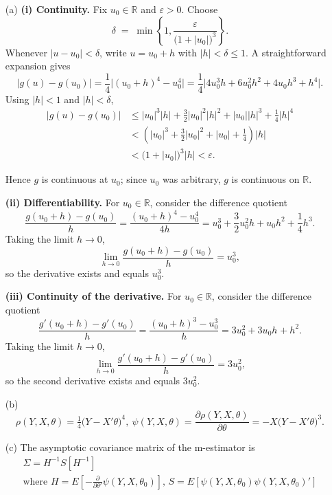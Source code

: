 \documentclass{article}
\begin{document}
\begin{itemize}
    \item[(a)]
    \textbf{(i) Continuity.}  
    Fix $u_0\in\mathbb R$ and $\varepsilon>0$.  Choose
    \[
    \delta \;=\;\min\!\left\{1,\frac{\varepsilon}{\bigl(1+|u_0|\bigr)^{3}}\right\}.
    \]
    Whenever $\lvert u-u_0\rvert<\delta$, write $u=u_0+h$ with $\lvert h\rvert<\delta\le1$.  A straightforward expansion gives
    \[
    \bigl|g(u)-g(u_0)\bigr|
       = \frac14\bigl|(u_0+h)^4-u_0^{4}\bigr|
       = \frac14\bigl|4u_0^{3}h+6u_0^{2}h^{2}+4u_0h^{3}+h^{4}\bigr|.
    \]
    Using $\lvert h\rvert<1$ and $\lvert h\rvert<\delta$, 
    \begin{align*}
        \bigl|g(u)-g(u_0)\bigr|
      &\le |u_0|^{3}\lvert h\rvert
         +\tfrac32 |u_0|^{2}|h|^{2}
         +|u_0| |h|^{3}
         +\tfrac14 |h|^{4}\\
         &<(|u_0|^3+\tfrac32 |u_0|^{2}+|u_0|+\tfrac14)|h|\\
      &< \bigl(1+|u_0|\bigr)^{3}\lvert h\rvert
      <\varepsilon.
    \end{align*}

    Hence $g$ is continuous at $u_0$; since $u_0$ was arbitrary, $g$ is continuous on $\mathbb R$.
    
    \medskip\noindent
    \textbf{(ii) Differentiability.}  
    For $u_0\in\mathbb R$, consider the difference quotient
    \[
    \frac{g(u_0+h)-g(u_0)}{h}
      =\frac{(u_0+h)^{4}-u_0^{4}}{4h}
      =u_0^{3}+\frac{3}{2}u_0^{2}h+u_0h^{2}+\frac14 h^{3}.
    \]
    Taking the limit $h\to0$,
    \[
    \lim_{h\to0}\frac{g(u_0+h)-g(u_0)}{h}=u_0^{3},
    \]
    so the derivative exists and equals $u_0^{3}$.
    
    \medskip\noindent
    \textbf{(iii) Continuity of the derivative.}  
    For $u_0\in\mathbb R$, consider the difference quotient
    \[
    \frac{g'(u_0+h)-g'(u_0)}{h}
      =\frac{(u_0+h)^{3}-u_0^{3}}{h}
      =3u_0^{2}+3u_0h^{}+ h^{2}.
    \]
    Taking the limit $h\to0$,
    \[
    \lim_{h\to0}\frac{g'(u_0+h)-g'(u_0)}{h}=3u_0^{2},
    \]
    so the second derivative exists and equals $3u_0^{2}$.

    \item[(b)]
    \[
    \rho(Y,X,\theta)=\tfrac14 \bigl(Y-X'\theta\bigr)^{4},
    \ 
    \psi(Y,X,\theta)= \frac{\partial \rho(Y,X,\theta)}{\partial\theta}=-X\bigl(Y-X'\theta\bigr)^3 .
    \]

    \item[(c)]
    The asymptotic covariance matrix of the m-estimator is
    \begin{align*}
        \Sigma = H^{-1} S [H^{-1}]\\
        \text{where } H = E\left[ -\frac{\partial}{\partial \theta'} \psi(Y,X,\theta_0) \right] \text{, } S = E\left[ \psi(Y,X,\theta_0) \psi(Y,X,\theta_0)' \right]
    \end{align*}
    

\end{itemize}
\end{document}
